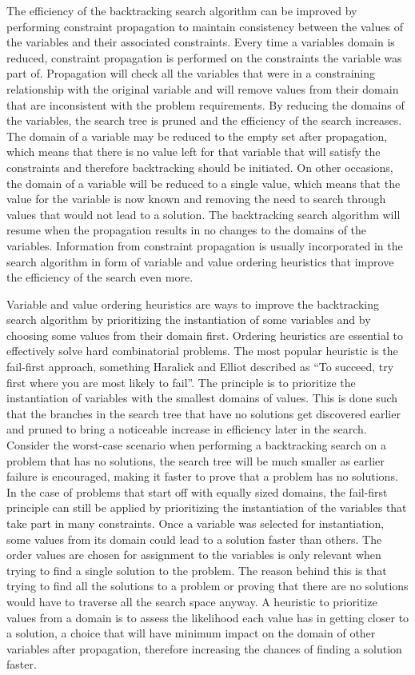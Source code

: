 \documentclass{l4proj}
\begin{document}
\noindent The efficiency of the backtracking search algorithm can be improved by performing constraint propagation to maintain consistency between the values of the variables and their associated constraints. Every time a variable\textquotesingle s domain is reduced, constraint propagation is performed on the constraints the variable was part of. Propagation will check all the variables that were in a constraining relationship with the original variable and will remove values from their domain that are inconsistent with the problem requirements. By reducing the domains of the variables, the search tree is pruned and the efficiency of the search increases. The domain of a variable may be reduced to the empty set after propagation, which means that there is no value left for that variable that will satisfy the constraints and therefore backtracking should be initiated. On other occasions, the domain of a variable will be reduced to a single value, which means that the value for the variable is now known and removing the need to search through values that would not lead to a solution. The backtracking search algorithm will resume when the propagation results in no changes to the domains of the variables. Information from constraint propagation is usually incorporated in the search algorithm in form of variable and value ordering heuristics that improve the efficiency of the search even more.

\noindent Variable and value ordering heuristics are ways to improve the backtracking search algorithm by prioritizing the instantiation of some variables and by choosing some values from their domain first. Ordering heuristics are essential to effectively solve hard combinatorial problems. The most popular heuristic is the fail-first approach, something Haralick and Elliot \cite{haralick1980increasing} described as ``To succeed, try first where you are most likely to fail''. The principle is to prioritize the instantiation of variables with the smallest domains of values. This is done such that the branches in the search tree that have no solutions get discovered earlier and pruned to bring a noticeable increase in efficiency later in the search. Consider the worst-case scenario when performing a backtracking search on a problem that has no solutions, the search tree will be much smaller as earlier failure is encouraged, making it faster to prove that a problem has no solutions. In the case of problems that start off with equally sized domains, the fail-first principle can still be applied by prioritizing the instantiation of the variables that take part in many constraints. Once a variable was selected for instantiation, some values from its domain could lead to a solution faster than others. The order values are chosen for assignment to the variables is only relevant when trying to find a single solution to the problem. The reason behind this is that trying to find all the solutions to a problem or proving that there are no solutions would have to traverse all the search space anyway. A heuristic to prioritize values from a domain is to assess the likelihood each value has in getting closer to a solution, a choice that will have minimum impact on the domain of other variables after propagation, therefore increasing the chances of finding a solution faster. 
\end{document}
